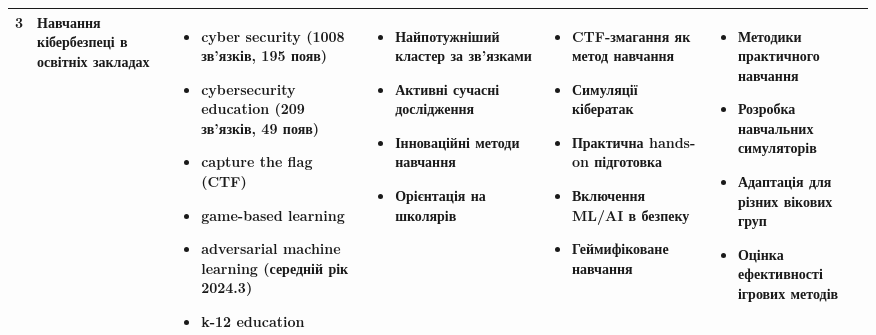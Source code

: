 \documentclass[12pt,a4paper,landscape]{article}
\begin{document}
\begin{longtable}{|p{1cm}|p{3.5cm}|p{5cm}|p{4cm}|p{4cm}|p{5cm}|}
\cellcolor{blue!20}3 & 
\textbf{Навчання кібербезпеці в освітніх закладах} & 
\begin{itemize}
    \item cyber security (1008 зв'язків, 195 появ)
    \item cybersecurity education (209 зв'язків, 49 появ)
    \item capture the flag (CTF)
    \item game-based learning
    \item adversarial machine learning (середній рік 2024.3)
    \item k-12 education
\end{itemize} & 
\begin{itemize}
    \item Найпотужніший кластер за зв'язками
    \item Активні сучасні дослідження
    \item Інноваційні методи навчання
    \item Орієнтація на школярів
\end{itemize} & 
\begin{itemize}
    \item CTF-змагання як метод навчання
    \item Симуляції кібератак
    \item Практична hands-on підготовка
    \item Включення ML/AI в безпеку
    \item Геймифіковане навчання
\end{itemize} & 
\begin{itemize}
    \item Методики практичного навчання
    \item Розробка навчальних симуляторів
    \item Адаптація для різних вікових груп
    \item Оцінка ефективності ігрових методів
\end{itemize} \\
\hline


\end{longtable}
\end{document}
